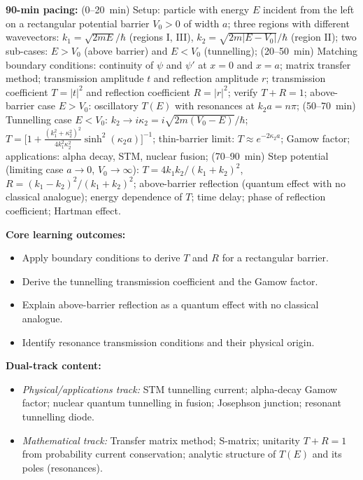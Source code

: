 \documentclass[11pt,a4paper]{article}
\begin{document}
\begin{tcolorbox}[modulebox, title={Module~I.4 / L10: Scattering from a Potential Barrier}]
\textbf{90-min pacing:} (0--20~min) Setup: particle with energy $E$ incident from the left on a
rectangular potential barrier $V_0>0$ of width $a$;
three regions with different wavevectors:
$k_1=\sqrt{2mE}/\hbar$ (regions I, III), $k_2=\sqrt{2m|E-V_0|}/\hbar$ (region II);
two sub-cases: $E>V_0$ (above barrier) and $E<V_0$ (tunnelling);
(20--50~min) Matching boundary conditions: continuity of $\psi$ and $\psi'$ at $x=0$ and $x=a$;
matrix transfer method; transmission amplitude $t$ and reflection amplitude $r$;
transmission coefficient $T=|t|^2$ and reflection coefficient $R=|r|^2$; verify $T+R=1$;
above-barrier case $E>V_0$: oscillatory $T(E)$ with resonances at $k_2 a=n\pi$;
(50--70~min) Tunnelling case $E<V_0$: $k_2\to i\kappa_2=i\sqrt{2m(V_0-E)}/\hbar$;
$T=\bigl[1+\tfrac{(k_1^2+\kappa_2^2)^2}{4k_1^2\kappa_2^2}\sinh^2(\kappa_2 a)\bigr]^{-1}$;
thin-barrier limit: $T\approx e^{-2\kappa_2 a}$; Gamow factor;
applications: alpha decay, STM, nuclear fusion;
(70--90~min) Step potential (limiting case $a\to0$, $V_0\to\infty$):
$T=4k_1k_2/(k_1+k_2)^2$, $R=(k_1-k_2)^2/(k_1+k_2)^2$;
above-barrier reflection (quantum effect with no classical analogue);
energy dependence of $T$; time delay; phase of reflection coefficient; Hartman effect.

\medskip\textbf{Core learning outcomes:}
\begin{itemize}[leftmargin=1.4em,topsep=2pt,itemsep=1pt]
  \item Apply boundary conditions to derive $T$ and $R$ for a rectangular barrier.
  \item Derive the tunnelling transmission coefficient and the Gamow factor.
  \item Explain above-barrier reflection as a quantum effect with no classical analogue.
  \item Identify resonance transmission conditions and their physical origin.
\end{itemize}

\medskip\textbf{Dual-track content:}
\begin{itemize}[leftmargin=1.4em,topsep=2pt,itemsep=1pt]
  \item \textit{Physical/applications track:} STM tunnelling current; alpha-decay Gamow factor;
    nuclear quantum tunnelling in fusion; Josephson junction; resonant tunnelling diode.
  \item \textit{Mathematical track:} Transfer matrix method; S-matrix; unitarity $T+R=1$ from
    probability current conservation; analytic structure of $T(E)$ and its poles (resonances).
\end{itemize}


\end{tcolorbox}
\end{document}
